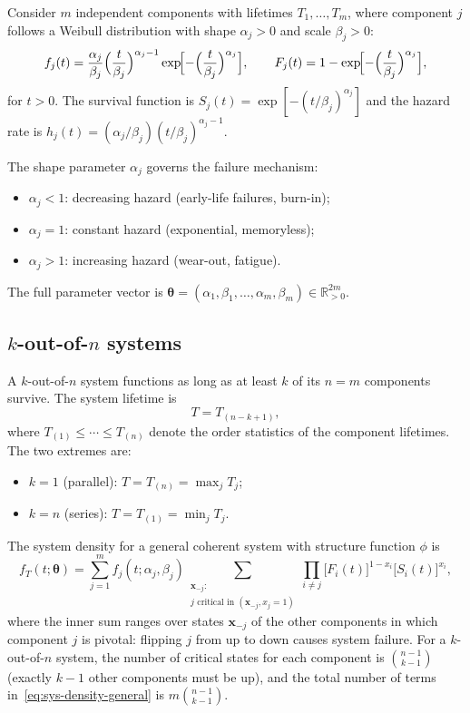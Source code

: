 \documentclass[12pt]{article}
\theoremstyle{definition}
\theoremstyle{remark}
\newcommand{\Rset}{\mathbb{R}}
\newcommand{\btheta}{\bm{\theta}}
\begin{document}
Consider $m$ independent components with lifetimes
$T_1, \ldots, T_m$, where component $j$ follows a Weibull
distribution with shape $\alpha_j > 0$ and scale $\beta_j > 0$:
\begin{equation}\label{eq:weibull-component}
  f_j(t) = \frac{\alpha_j}{\beta_j}
    \Bigl(\frac{t}{\beta_j}\Bigr)^{\alpha_j - 1}
    \exp\!\Bigl[-\Bigl(\frac{t}{\beta_j}\Bigr)^{\alpha_j}\Bigr],
  \qquad
  F_j(t) = 1 - \exp\!\Bigl[-\Bigl(\frac{t}{\beta_j}\Bigr)^{\alpha_j}\Bigr],
\end{equation}
for $t > 0$.  The survival function is
$S_j(t) = \exp[-(t/\beta_j)^{\alpha_j}]$ and the hazard rate is
$h_j(t) = (\alpha_j/\beta_j)(t/\beta_j)^{\alpha_j - 1}$.

The shape parameter $\alpha_j$ governs the failure mechanism:
\begin{itemize}
\item $\alpha_j < 1$: decreasing hazard (early-life failures,
  burn-in);
\item $\alpha_j = 1$: constant hazard (exponential, memoryless);
\item $\alpha_j > 1$: increasing hazard (wear-out, fatigue).
\end{itemize}

The full parameter vector is
$\btheta = (\alpha_1, \beta_1, \ldots, \alpha_m, \beta_m)
\in \Rset_{>0}^{2m}$.

\subsection{\texorpdfstring{$k$-out-of-$n$}{k-out-of-n} systems}

A $k$-out-of-$n$ system functions as long as at least $k$ of its
$n = m$ components survive.  The system lifetime is
\begin{equation}\label{eq:kofn-lifetime}
  T = T_{(n-k+1)},
\end{equation}
where $T_{(1)} \leq \cdots \leq T_{(n)}$ denote the order
statistics of the component lifetimes.  The two extremes are:
\begin{itemize}
\item $k = 1$ (parallel): $T = T_{(n)} = \max_j T_j$;
\item $k = n$ (series): $T = T_{(1)} = \min_j T_j$.
\end{itemize}

The system density for a general coherent system with structure
function $\phi$ is \citep{Samaniego2007}
\begin{equation}\label{eq:sys-density-general}
  f_T(t; \btheta) = \sum_{j=1}^m f_j(t; \alpha_j, \beta_j)
  \sum_{\substack{\mathbf{x}_{-j} : \\ j \text{ critical in }
  (\mathbf{x}_{-j}, x_j = 1)}}
  \prod_{i \neq j} \bigl[F_i(t)\bigr]^{1-x_i}
  \bigl[S_i(t)\bigr]^{x_i},
\end{equation}
where the inner sum ranges over states $\mathbf{x}_{-j}$ of the
other components in which component $j$ is pivotal: flipping $j$
from up to down causes system failure.  For a $k$-out-of-$n$
system, the number of critical states for each component is
$\binom{n-1}{k-1}$ (exactly $k-1$ other components must be up),
and the total number of terms in~\eqref{eq:sys-density-general}
is $m \binom{n-1}{k-1}$.
\end{document}
